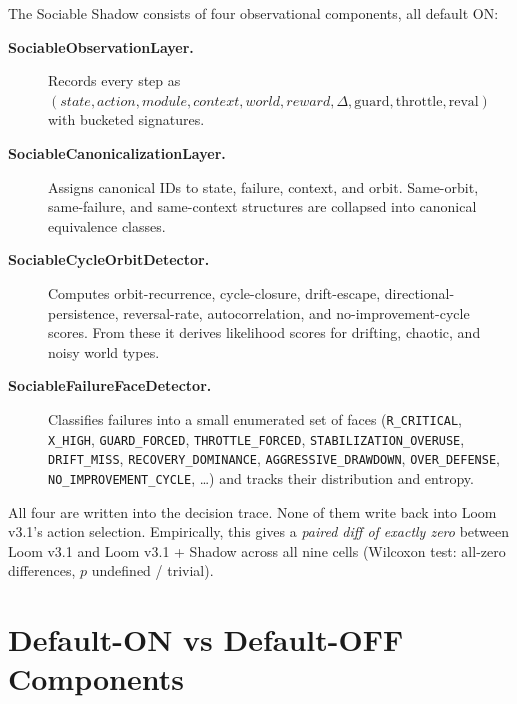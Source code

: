 The Sociable Shadow consists of four observational components,
all default ON:

\begin{description}
  \item[\textbf{SociableObservationLayer.}]
    {\raggedright
    Records every step as $(state, action, module, context, world,
    reward, \Delta, \mathrm{guard}, \mathrm{throttle}, \mathrm{reval})$
    with bucketed signatures.\par}
  \item[\textbf{SociableCanonicalizationLayer.}]
    Assigns canonical IDs to state, failure, context, and orbit.
    Same-orbit, same-failure, and same-context structures are
    collapsed into canonical equivalence classes.
  \item[\textbf{SociableCycleOrbitDetector.}]
    Computes orbit-recurrence, cycle-closure, drift-escape,
    directional-persistence, reversal-rate, autocorrelation, and
    no-improvement-cycle scores. From these it derives
    likelihood scores for drifting, chaotic, and noisy world types.
  \item[\textbf{SociableFailureFaceDetector.}]
    Classifies failures into a small enumerated set of faces
    (\texttt{R\_CRITICAL}, \texttt{X\_HIGH}, \texttt{GUARD\_FORCED},
    \texttt{THROTTLE\_FORCED}, \texttt{STABILIZATION\_OVERUSE},
    \texttt{DRIFT\_MISS}, \texttt{RECOVERY\_DOMINANCE},
    \texttt{AGGRESSIVE\_DRAWDOWN}, \texttt{OVER\_DEFENSE},
    \texttt{NO\_IMPROVEMENT\_CYCLE}, \dots) and tracks their
    distribution and entropy.
\end{description}

All four are written into the decision trace. None of them write back
into Loom v3.1's action selection. Empirically, this gives a
\emph{paired diff of exactly zero} between Loom v3.1 and Loom v3.1 +
Shadow across all nine cells (Wilcoxon test: all-zero differences,
$p$ undefined / trivial).

\section{Default-ON vs Default-OFF Components}


